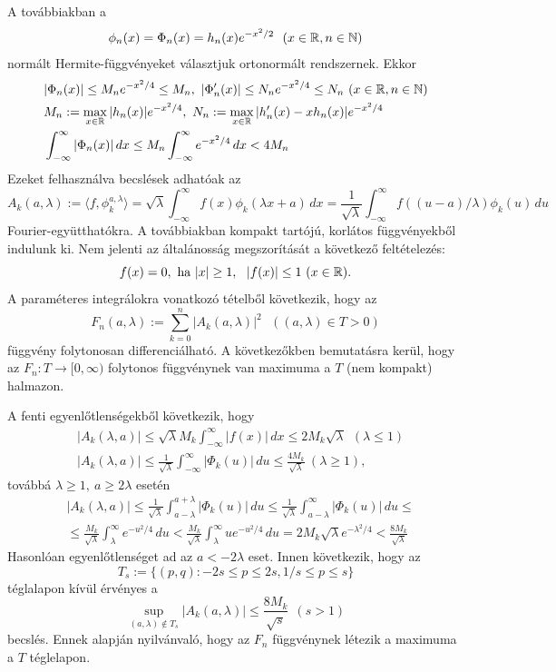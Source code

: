 \documentclass[oneside,titlepage,12pt,a4paper]{report}
\begin{document}
 A továbbiakban a
 $$
 \phi_n(x)=\Phi_n(x)=h_n(x)e^{-x^2/2}\ \ (x\in\Bbb R, n\in\Bbb N)
 $$
 normált Hermite-függvényeket választjuk ortonormált rendszernek. Ekkor
 \begin{equation}
 \begin{split}
 &|\Phi_n(x)|\le M_n e^{-x^2/4}\le M_n, \ |\Phi_n'(x)|\le N_n e^{-x^2/4}\le N_n\ (x\in\Bbb R, n\in\Bbb N)\\
 &M_n:=\max_{x\in\Bbb R}|h_n(x)|e^{-x^2/4},\ N_n:=\max_{x\in\Bbb R}|h'_n(x)-xh_n(x)|e^{-x^2/4}\\
 &\int_{-\infty}^\infty|\Phi_n(x)|\, dx\le M_n\int_{-\infty}^\infty e^{-x^2/4}\, dx<4M_n
 \end{split}
 \end{equation}
 Ezeket felhasználva becslések adhatóak az
 $$
 A_k(a,\lambda):=\langle f,\phi_k^{a,\lambda}\rangle=\sqrt{\lambda}\int_{-\infty}^\infty f(x)\phi_k(\lambda x+a)\, dx=\frac 1{\sqrt{\lambda}}\int_{-\infty}^\infty f((u-a)/\lambda)\phi_k(u)\, du
 $$
 Fourier-együtthatókra. A továbbiakban kompakt tartójú, korlátos függvényekből indulunk ki. Nem jelenti az általánosság megszorítását a következő feltételezés:
 $$
 f(x)=0,\ \text{ha}\ |x|\ge 1,\ \ |f(x)|\le 1 \ (x\in\Bbb R).
 $$
 A paraméteres integrálokra vonatkozó tételből  következik, hogy   az
 $$
 F_n(a,\lambda):=\sum_{k=0}^n|A_k(a,\lambda)|^2\ \ \  ((a,\lambda)\in T>0)
 $$
 függvény folytonosan  differenciálható. A következőkben bemutatásra kerül, hogy az $F_n:T\to [0,\infty)$
 folytonos függvénynek van maximuma a $T$ (nem kompakt) halmazon.

 A fenti egyenlőtlenségekből következik, hogy
 \begin{equation}
 \begin{split}
 &|A_k(\lambda,a)|\le \sqrt{\lambda} M_k\int_{-\infty}^\infty |f(x)|\, dx\le 2M_k\sqrt{\lambda}\ \ (\lambda\le 1)\\
 &|A_k(\lambda,a)|\le\frac 1{\sqrt{\lambda}}\int_{-\infty}^\infty |\Phi_k(u)|\, du\le
 \frac {4M_k}{\sqrt{\lambda}}\ (\lambda\ge 1),
 \end{split}
 \end{equation}
 továbbá $\lambda\ge 1,\ a\ge 2\lambda $ eset\'en
 \begin{equation}
 \begin{split}
 &|A_k(\lambda,a)|\le \frac 1{\sqrt{\lambda}}\int_{a-\lambda}^{a+\lambda}|\Phi_k(u)|\, du
 \le \frac 1{\sqrt{\lambda}}\int_{a-\lambda}^\infty |\Phi_k(u)|\, du\le\\
 &\le \frac {M_k}{\sqrt{\lambda}}\int_\lambda^\infty e^{-{u^2}/4}\, du<
 \frac {M_k}{\sqrt{\lambda}}\int_\lambda^\infty u e^{-{u^2}/4}\, du=
 2 M_k\sqrt{\lambda} e^{-{\lambda^2}/4}<\frac {8M_k}{\sqrt{\lambda}}
\end{split}
\end{equation}
Hasonlóan egyenlőtlenséget ad az $a<-2\lambda$ eset. Innen következik, hogy az
$$
T_s:=\{(p,q): -2s\le p\le 2s, 1/s\leq p \le s\}
$$
téglalapon kívül  érvényes a
$$
\sup_{(a,\lambda) \notin T_s}|A_k(a,\lambda)|\le \frac {8M_k}{\sqrt s}\ \  (s>1)
$$
becslés. Ennek alapján nyilvánvaló, hogy az $F_n$  függvénynek létezik a maximuma a $T$ téglelapon.
\end{document}
